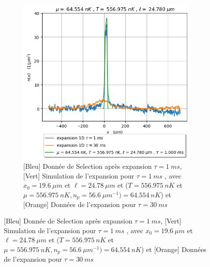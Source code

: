 \documentclass[a3, 10pt,twoside]{article}          %
\theoremstyle{plain}
\theoremstyle{definition}
\theoremstyle{remark}
\theoremstyle{definition} %
\begin{document}
\begin{figure}[!ht]
\begin{subfigure}[b]{0.45\textwidth}
        		\centering
        		\includegraphics[width=\textwidth]{Figures/simul_expansion_1_24-04-2024}
        		\caption{{\color{blue}[Bleu] Donnée de Selection après expansion $\tau = 1~ms$}, {\color{OliveGreen}[Vert]  Simulation de l'expansion pour $\tau= 1~ms$  , avec $x_0 = 19.6~\mu m$ et $\ell = 24.78~\mu m$ et ($T = 556.975 ~nK$ et $\mu=556.975 ~nK  , n_p = 56.6 ~{\mu m}^{-1} )= 64.554~nK$)} et { \color{orange}[Orange] Données de l'expansion pour $\tau = 30~ms$  } }
        		\label{fig:expansion1}
    		\end{subfigure}
    		
    		\vspace{1em}
    		

\end{figure}
\end{document}
